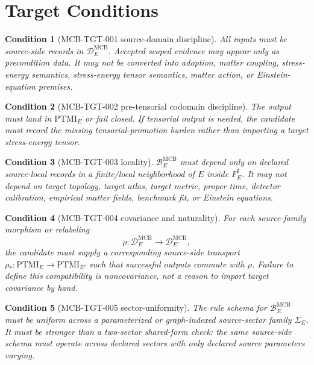 \documentclass[11pt]{article}
\newcommand{\PTMI}{\mathrm{PTMI}}
\newtheorem{condition}{Condition}
\begin{document}
\section{Target Conditions}

\begin{condition}[MCB-TGT-001 source-domain discipline]
All inputs must be source-side records in
\(\mathcal{D}^{\mathrm{MCB}}_E\). Accepted scoped evidence may appear only as
precondition data. It may not be converted into adoption, matter coupling,
stress-energy semantics, stress-energy tensor semantics, matter action, or
Einstein-equation premises.
\end{condition}

\begin{condition}[MCB-TGT-002 pre-tensorial codomain discipline]
The output must land in \(\PTMI_E\) or fail closed. If tensorial output is
needed, the candidate must record the missing tensorial-promotion burden
rather than importing a target stress-energy tensor.
\end{condition}

\begin{condition}[MCB-TGT-003 locality]
\(\mathcal{B}^{\mathrm{MCB}}_E\) must depend only on declared source-local
records in a finite/local neighborhood of \(E\) inside \(F_E^\sharp\). It may
not depend on target topology, target atlas, target metric, proper time,
detector calibration, empirical matter fields, benchmark fit, or Einstein
equations.
\end{condition}

\begin{condition}[MCB-TGT-004 covariance and naturality]
For each source-family morphism or relabeling
\[
  \rho: \mathcal{D}^{\mathrm{MCB}}_E \to
  \mathcal{D}^{\mathrm{MCB}}_{E'},
\]
the candidate must supply a corresponding source-side transport
\(\rho_*:\PTMI_E\to \PTMI_{E'}\) such that successful outputs commute with
\(\rho\). Failure to define this compatibility is noncovariance, not a reason
to import target covariance by hand.
\end{condition}

\begin{condition}[MCB-TGT-005 sector-uniformity]
The rule schema for \(\mathcal{B}^{\mathrm{MCB}}_E\) must be uniform across a
parameterized or graph-indexed source-sector family \(\Sigma_E\). It must be
stronger than a two-sector shared-form check: the same source-side schema must
operate across declared sectors with only declared source parameters varying.
\end{condition}
\end{document}
